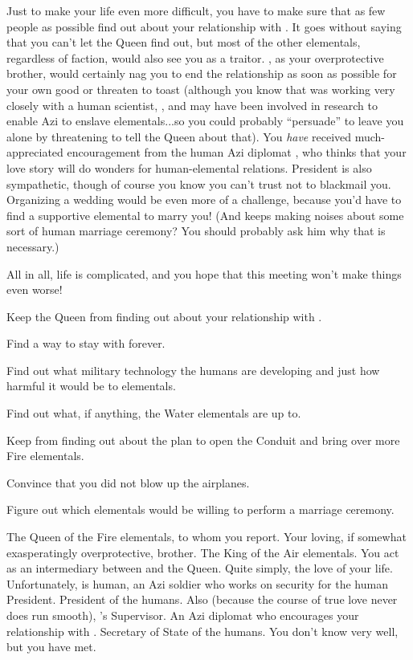 \documentclass[char]{elementals}
\begin{document}
Just to make your life even more difficult, you have to make sure that as few people as possible find out about your relationship with \cRomeo{}.  It goes without saying that you can't let the Queen find out, but most of the other elementals, regardless of faction, would also see you as a traitor.  \cPyro{}, as your overprotective brother, would certainly nag you to end the relationship as soon as possible for your own good or threaten to toast \cRomeo{} (although you know that \cPyro{\they} was working very closely with a human scientist, \cMS{\intro}, and may have been involved in research to enable Azi to enslave elementals...so you could probably ``persuade'' \cPyro{\them} to leave you alone by threatening to tell the Queen about that).  You \emph{have} received much-appreciated encouragement from the human Azi diplomat \cDiplomat{\intro}, who thinks that your love story will do wonders for human-elemental relations.  President \cLeader{} is also sympathetic, though of course you know you can't trust \cLeader{\them} not to blackmail you.  Organizing a wedding would be even more of a challenge, because you'd have to find a supportive elemental to marry you!  (And \cRomeo{} keeps making noises about some sort of human marriage ceremony?  You should probably ask him why that is necessary.)

All in all, life is complicated, and you hope that this meeting won't make things even worse!

\begin{itemz}[Goals]
  \item Keep the Queen from finding out about your relationship with \cRomeo{}.
  \item Find a way to stay with \cRomeo{} forever.
  \item Find out what military technology the humans are developing and just how harmful it would be to elementals.
  \item Find out what, if anything, the Water elementals are up to.
  \item Keep \cRomeo{} from finding out about the plan to open the Conduit and bring over more Fire elementals.
  \item Convince \cRomeo{} that you did not blow up the airplanes.
  \item Figure out which elementals would be willing to perform a marriage ceremony.
\end{itemz}

\begin{contacts}
  \contact{\cQueen{}} The Queen of the Fire elementals, to whom you report.
  \contact{\cPyro{}} Your loving, if somewhat exasperatingly overprotective, brother.
  \contact{\cKing{}} The King of the Air elementals.  You act as an intermediary between \cKing{\them} and the Queen.
  \contact{\cRomeo{}} Quite simply, the love of your life.  Unfortunately, \cRomeo{\they} is human, an Azi soldier who works on security for the human President.
  \contact{\cLeader{}} President of the humans.  Also (because the course of true love never does run smooth), \cRomeo{}'s Supervisor.
  \contact{\cDiplomat{}} An Azi diplomat who encourages your relationship with \cRomeo{}.
  \contact{\cDema{}} Secretary of State of the humans.  You don't know \cDema{\them} very well, but you have met.
\end{contacts}
\end{document}
